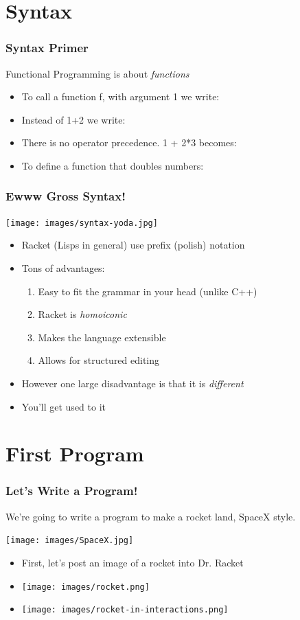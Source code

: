 \documentclass{beamer}
\begin{document}
\section{Syntax}
\begin{frame}
  \frametitle{Syntax Primer}
  Functional Programming is about \emph{functions}
  \begin{itemize}
  \item<1-> To call a function f, with argument 1 we write: \syntaxOne
  \item<2-> Instead of 1+2 we write: \syntaxTwo
  \item<3-> There is no operator precedence. 1 + 2*3 becomes: \syntaxThree
  \item<4-> To define a function that doubles numbers: \syntaxFour    
  \end{itemize}
\end{frame}

\begin{frame}
  \frametitle{Ewww Gross Syntax!}
  \begin{center}
    \texttt{[image: images/syntax-yoda.jpg]}
    \begin{itemize}
    \item<2-> Racket (Lisps in general) use prefix (polish) notation
    \item<3-> Tons of advantages:
      \begin{enumerate}
      \item<4-> Easy to fit the grammar in your head (unlike C++)
      \item<5-> Racket is \emph{homoiconic}
      \item<6-> Makes the language extensible
      \item<7-> Allows for structured editing
      \end{enumerate}
    \item<8-> However one large disadvantage is that it is \emph{different}
    \item<9-> You'll get used to it
    \end{itemize}
  \end{center}
\end{frame}


\section{First Program}
\begin{frame}
  \frametitle{Let's Write a Program!}
  We're going to write a program to make a rocket land, SpaceX style.
  \begin{center}
    \texttt{[image: images/SpaceX.jpg]}
  \end{center}
  \begin{itemize}
  \item<2-> First, let's post an image of a rocket into Dr. Racket
  \item<3-> \texttt{[image: images/rocket.png]}
  \item<4-> \texttt{[image: images/rocket-in-interactions.png]}
  \end{itemize}
\end{frame}
\end{document}
